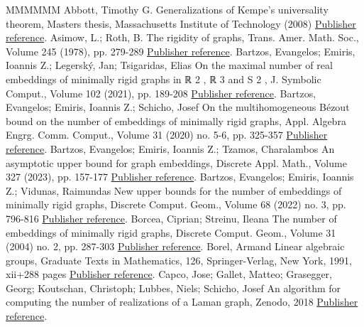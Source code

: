 \begin{thebibliography}{MMMMMM}
 Abbott, Timothy G. Generalizations of Kempe’s universality theorem, Masters thesis, Massachusetts Institute of Technology (2008) \href{https://alco.centre-mersenne.org/articles/10.5802/alco.390/#Abbot}{Publisher reference}.
 Asimow, L.; Roth, B. The rigidity of graphs, Trans. Amer. Math. Soc., Volume 245 (1978), pp. 279-289 \href{https://alco.centre-mersenne.org/articles/10.5802/alco.390/#AsimowRothI}{Publisher reference}.
 Bartzos, Evangelos; Emiris, Ioannis Z.; Legerský, Jan; Tsigaridas, Elias On the maximal number of real embeddings of minimally rigid graphs in ℝ 2 , ℝ 3  and S 2 , J. Symbolic Comput., Volume 102 (2021), pp. 189-208 \href{https://alco.centre-mersenne.org/articles/10.5802/alco.390/#Bartzos2021}{Publisher reference}.
 Bartzos, Evangelos; Emiris, Ioannis Z.; Schicho, Josef On the multihomogeneous Bézout bound on the number of embeddings of minimally rigid graphs, Appl. Algebra Engrg. Comm. Comput., Volume 31 (2020) no. 5-6, pp. 325-357 \href{https://alco.centre-mersenne.org/articles/10.5802/alco.390/#Bartzos2020}{Publisher reference}.
 Bartzos, Evangelos; Emiris, Ioannis Z.; Tzamos, Charalambos An asymptotic upper bound for graph embeddings, Discrete Appl. Math., Volume 327 (2023), pp. 157-177 \href{https://alco.centre-mersenne.org/articles/10.5802/alco.390/#Bartzos2023}{Publisher reference}.
 Bartzos, Evangelos; Emiris, Ioannis Z.; Vidunas, Raimundas New upper bounds for the number of embeddings of minimally rigid graphs, Discrete Comput. Geom., Volume 68 (2022) no. 3, pp. 796-816 \href{https://alco.centre-mersenne.org/articles/10.5802/alco.390/#BartzosUpperBound}{Publisher reference}.
 Borcea, Ciprian; Streinu, Ileana The number of embeddings of minimally rigid graphs, Discrete Comput. Geom., Volume 31 (2004) no. 2, pp. 287-303 \href{https://alco.centre-mersenne.org/articles/10.5802/alco.390/#BorceaStreinu}{Publisher reference}.
 Borel, Armand Linear algebraic groups, Graduate Texts in Mathematics, 126, Springer-Verlag, New York, 1991, xii+288 pages \href{https://alco.centre-mersenne.org/articles/10.5802/alco.390/#borel91}{Publisher reference}.
 Capco, Jose; Gallet, Matteo; Grasegger, Georg; Koutschan, Christoph; Lubbes, Niels; Schicho, Josef An algorithm for computing the number of realizations of a Laman graph, Zenodo, 2018 \href{https://alco.centre-mersenne.org/articles/10.5802/alco.390/#ZenodoAlg}{Publisher reference}.

\end{thebibliography}
